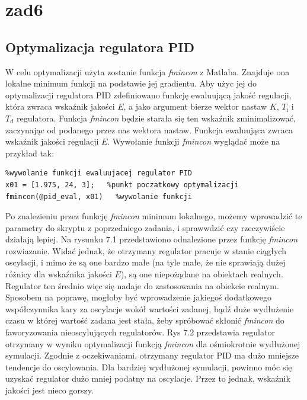 \chapter{zad6}
\section{Optymalizacja regulatora PID}


W  celu optymalizacji użyta zostanie funkcja \emph{fmincon} z Matlaba. Znajduje ona lokalne minimum funkcji na podstawie jej gradientu. Aby użyc jej do optymalizacji regulatora PID zdefiniowano funkcję ewaluującą jakość regulacji, która zwraca wskaźnik jakości $E$, a jako argument bierze wektor nastaw $K$, $T_{\mathrm{i}}$ i $T_{\mathrm{d}}$ regulatora. Funkcja \emph{fmincon} będzie starała się ten wskaźnik zminimalizować, zaczynając od podanego przez nas wektora nastaw. Funkcja ewaluująca zwraca wskaźnik jakości regulacji $E$. Wywołanie funkcji \emph{fmincon} wyglądać może na przykład tak:

\begin{lstlisting}
%wywolanie funkcji ewaluujacej regulator PID
x01 = [1.975, 24, 3];   %punkt poczatkowy optymalizacji
fmincon(@pid_eval, x01)   %wywolanie funkcji
\end{lstlisting}

Po znalezieniu przez funkcję \emph{fmincon} minimum lokalnego, możemy wprowadzić te parametry do skryptu z poprzedniego zadania, i sprawwdzić czy rzeczywiście działają lepiej. Na rysunku 7.1 przedstawiono odnalezione przez funkcję \emph{fmincon} rozwiazanie. Widać jednak, że otrzymany regulator pracuje w stanie ciągłych oscylacji, i mimo że są one bardzo małe (na tyle małe, że nie sprawiają dużej różnicy dla wskaźnika jakości $E$), są one niepożądane na obiektach realnych. Regulator ten średnio więc się nadaje do zastosowania na obiekcie realnym. Sposobem na poprawę, mogłoby być wprowadzenie jakiegoś dodatkowego współczynnika kary za oscylacje wokół wartości zadanej, bądź duże wydłużenie czasu w której wartość zadana jest stała, żeby spróbować skłonić \emph{fmincon} do faworyzowania nieoscylujących regulatorów. Rys 7.2 przedstawia regulator otrzymany w wyniku optymalizacji funkcją \emph{fmincon} dla ośmiokrotnie wydłużonej symulacji. Zgodnie z oczekiwaniami, otrzymany regulator PID ma dużo mniejsze tendencje do oscylowania. Dla bardziej wydłużonej symulacji, powinno móc się uzyskać regulator dużo mniej podatny na oscylacje. Przez to jednak, wskaźnik jakości jest nieco gorszy.


